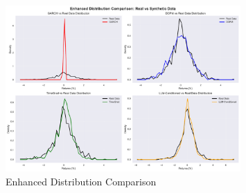 \begin{figure}[htbp]
\centering
\includegraphics[width=0.8\textwidth]{figures/enhanced_distribution_comparison.pdf}
\caption{Enhanced Distribution Comparison}
\label{fig:enhanceddistributioncomparison}
\end{figure}